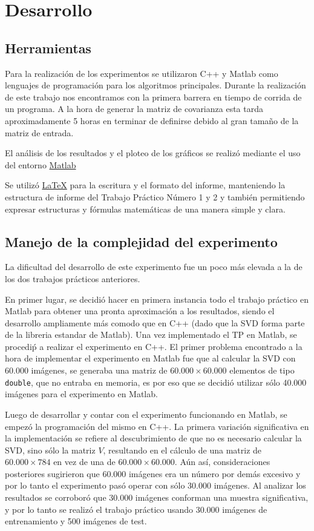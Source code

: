 \section{Desarrollo}

\subsection{Herramientas}

Para la realizaci\'on de los experimentos se utilizaron C++ y Matlab como lenguajes de
programaci\'on para los algoritmos principales. Durante la realizaci\'on de este trabajo nos encontramos con
la primera barrera en tiempo de corrida de un programa. A la hora de generar la
matriz de covarianza esta tarda aproximadamente 5 horas en terminar de definirse
debido al gran tama\~no de la matriz de entrada.

El an\'alisis de los resultados y el ploteo de los gr\'aficos se realiz\'o
mediante el uso del entorno \href{http://www.Matlab.com/}{Matlab}

Se utiliz\'o \href{http://www.latex-project.org/}{\LaTeX} para la escritura y el formato del informe,
manteniendo la estructura de informe del Trabajo Pr\'actico N\'umero 1 y 2 y tambi\'en
permitiendo expresar estructuras y f\'ormulas matem\'aticas de una manera simple y clara.

\subsection{Manejo de la complejidad del experimento}

La dificultad del desarrollo de este experimento fue un poco m\'as elevada a la de los dos
trabajos pr\'acticos anteriores.

En primer lugar, se decidi\'o hacer en primera instancia todo el trabajo pr\'actico en Matlab para obtener
una pronta aproximaci\'on a los resultados, siendo el desarrollo ampliamente m\'as comodo que
en C++ (dado que la SVD forma parte de la libreria estandar de Matlab). Una vez implementado
el TP en Matlab, se procedi\'p a realizar el experimento en C++. El primer problema encontrado
a la hora de implementar el experimento en Matlab fue que al calcular la SVD con 60.000 im\'agenes,
se generaba una matriz de $60.000 \times 60.000$ elementos de tipo \texttt{double}, que no entraba en
memoria, es por eso que se decidi\'o utilizar s\'olo 40.000 im\'agenes para el experimento en Matlab.

Luego de desarrollar y contar con el experimento funcionando en Matlab, se empez\'o la programaci\'on
del mismo en C++. La primera variaci\'on significativa en la implementaci\'on se refiere al
descubrimiento de que no es necesario calcular la SVD, sino s\'olo la matriz $V$, resultando
en el c\'alculo de una matriz de $60.000 \times 784$ en vez de una de $60.000 \times 60.000$.
A\'un as\'i, consideraciones posteriores sugirieron que 60.000 im\'agenes era un n\'umero por
dem\'as excesivo y por lo tanto el experimento pas\'o operar con s\'olo 30.000 im\'agenes.
Al analizar los resultados se corrobor\'o que 30.000 im\'agenes conforman una muestra significativa,
y por lo tanto se realiz\'o el trabajo pr\'actico usando 30.000 im\'agenes de entrenamiento y 500 im\'agenes de test.

